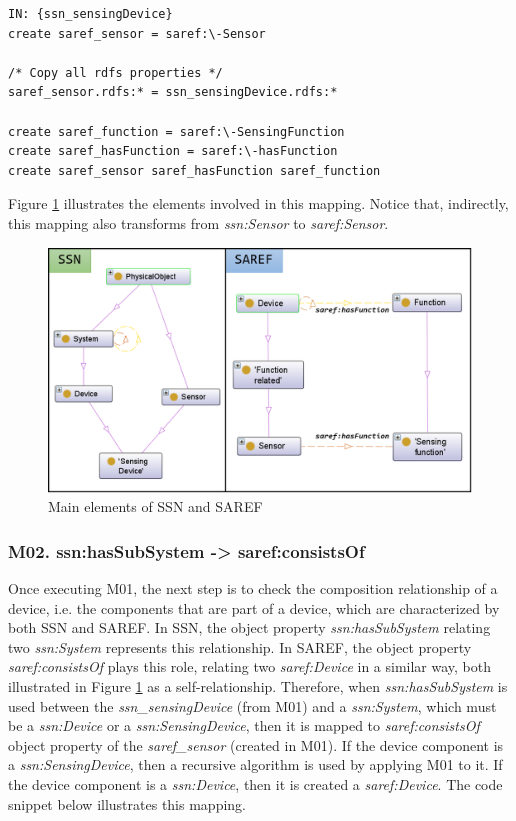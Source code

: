 \documentclass{sig-alternate-05-2015}
\begin{document}
\begin{lstlisting}[caption={Pseudocode snippet for M01},label={code:sample}]
IN: {ssn_sensingDevice}  
create saref_sensor = saref:\-Sensor  

/* Copy all rdfs properties */ 
saref_sensor.rdfs:* = ssn_sensingDevice.rdfs:*
    
create saref_function = saref:\-SensingFunction  
create saref_hasFunction = saref:\-hasFunction  
create saref_sensor saref_hasFunction saref_function  

\end{lstlisting}

Figure \ref{fig:SSN_SAREF_SensingDevice_Device} illustrates the elements involved in this mapping. Notice that, indirectly, this mapping also transforms from \textit{ssn:\-Sensor} to \textit{saref:\-Sensor}.

\begin{figure}[h!]
\centering
\includegraphics[scale=0.28]{SSN_SAREF_SensingDevice_Device}
\caption{Main elements of SSN and SAREF}
\label{fig:SSN_SAREF_SensingDevice_Device}
\end{figure}

\subsubsection{M02. ssn:\-hasSubSystem -> saref:\-consistsOf}
Once executing M01, the next step is to check the composition relationship of a device, i.e. the components that are part of a device, which are characterized by both SSN and SAREF. In SSN, the object property \textit{ssn:\-hasSubSystem} relating two \textit{ssn:\-System} represents this relationship. In SAREF, the object property \textit{saref:\-consistsOf} plays this role, relating two \textit{saref:\-Device} in a similar way, both illustrated in Figure \ref{fig:SSN_SAREF_SensingDevice_Device} as a self-relationship. Therefore, when \textit{ssn:\-hasSubSystem} is used between the \textit{ssn\_sensingDevice} (from M01) and a \textit{ssn:\-System}, which must be a \textit{ssn:\-Device} or a \textit{ssn:\-SensingDevice}, then it is mapped to \textit{saref:\-consistsOf} object property of the \textit{saref\_sensor} (created in M01). If the device component is a \textit{ssn:\-SensingDevice}, then a recursive algorithm is used by applying M01 to it. If the device component is a \textit{ssn:\-Device}, then it is created a \textit{saref:\-Device}. The code snippet below illustrates this mapping.
\end{document}
